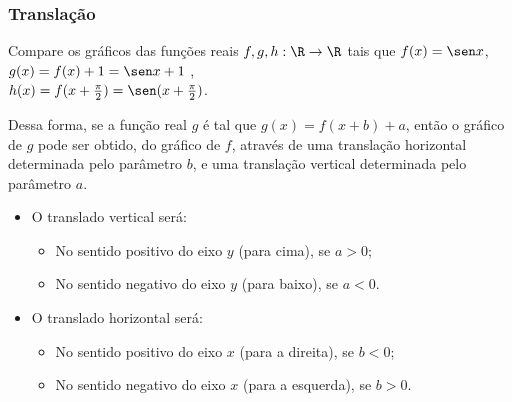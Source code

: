 \subsubsection{Translação}

\begin{example}
    Compare os gráficos das funções reais $f, g , h: \R \to \R$ tais que
$f(x) = \sen x$, \\ $g(x) = f(x) + 1 = \sen x +1$ , \\ $h(x)=
f(x+\frac {\pi} 2)= \sen (x+ \frac {\pi} 2)$.
\end{example}

Dessa forma, se a função real $g$ é tal que $g(x) = f(x+b) +a$,
então o gráfico de $g$ pode ser obtido, do gráfico de $f$, através
de uma translação horizontal determinada pelo parâmetro $b$, e uma
translação vertical determinada pelo parâmetro $a$. 
\begin{itemize}
  \item O translado vertical será:
        \begin{itemize}
          \item No sentido positivo do eixo $y$ (para cima), se
          $a>0$;
          \item No sentido negativo do eixo $y$ (para baixo), se
          $a<0$.
        \end{itemize} 
  \item O translado horizontal será:
        \begin{itemize}
          \item No sentido positivo do eixo $x$ (para a direita), se $b<0$;
          \item No sentido negativo do eixo $x$ (para a esquerda), se $b>0$.
        \end{itemize}
\end{itemize}